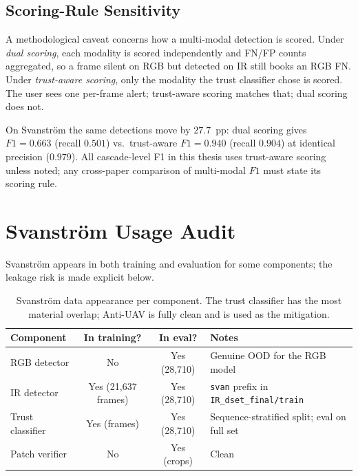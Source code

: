 \subsection{Scoring-Rule Sensitivity}
\label{sec:scoring_audit}

A methodological caveat concerns how a multi-modal detection is scored. Under \emph{dual scoring}, each modality is scored independently and FN/FP counts aggregated, so a frame silent on RGB but detected on IR still books an RGB FN. Under \emph{trust-aware scoring}, only the modality the trust classifier chose is scored. The user sees one per-frame alert; trust-aware scoring matches that; dual scoring does not.

On Svanstr\"om the same detections move by $27.7$~pp: dual scoring gives $F1=0.663$ (recall $0.501$) vs.\ trust-aware $F1=0.940$ (recall $0.904$) at identical precision ($0.979$). All cascade-level F1 in this thesis uses trust-aware scoring unless noted; any cross-paper comparison of multi-modal $F1$ must state its scoring rule.

\section{Svanstr\"om Usage Audit}
\label{sec:svanstrom_audit}

Svanstr\"om appears in both training and evaluation for some components; the leakage risk is made explicit below.

\begin{table}[htbp]
    \centering
    \caption{Svanstr\"om data appearance per component. The trust classifier has the most material overlap; Anti-UAV is fully clean and is used as the mitigation.}
    \label{tab:svanstrom_audit}
    \begin{tabular}{lccl}
        \toprule
        Component & In training? & In eval? & Notes \\
        \midrule
        RGB detector  & No  & Yes (28,710) & Genuine OOD for the RGB model \\
        IR detector   & Yes (21{,}637 frames) & Yes (28,710) & \texttt{svan} prefix in \texttt{IR\_dset\_final/train} \\
        Trust classifier & Yes (frames) & Yes (28,710) & Sequence-stratified split; eval on full set \\
        Patch verifier & No & Yes (crops) & Clean \\
        \bottomrule
    \end{tabular}
\end{table}


